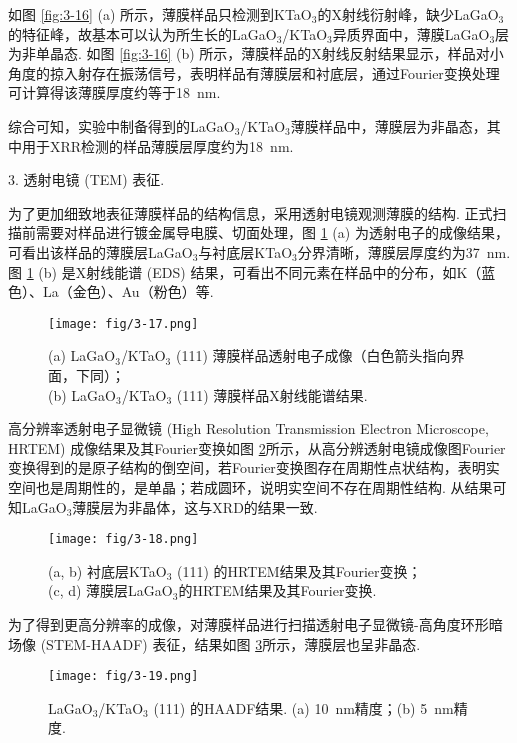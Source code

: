 \documentclass[12pt,a4paper,openany,twoside,UTF-8]{book}
\begin{document}
如图 \ref{fig:3-16} (a) 所示，薄膜样品只检测到KTaO$_3$的X射线衍射峰，缺少LaGaO$_3$的特征峰，故基本可以认为所生长的LaGaO$_3$/KTaO$_3$异质界面中，薄膜LaGaO$_3$层为非单晶态. 如图 \ref{fig:3-16} (b) 所示，薄膜样品的X射线反射结果显示，样品对小角度的掠入射存在振荡信号，表明样品有薄膜层和衬底层，通过Fourier变换处理可计算得该薄膜厚度约等于\SI{18}{nm}. 

综合可知，实验中制备得到的LaGaO$_3$/KTaO$_3$薄膜样品中，薄膜层为非晶态，其中用于XRR检测的样品薄膜层厚度约为\SI{18}{nm}. 

3. 透射电镜 (TEM) 表征.

为了更加细致地表征薄膜样品的结构信息，采用透射电镜观测薄膜的结构. 正式扫描前需要对样品进行镀金属导电膜、切面处理，图 \ref{fig:3-17} (a) 为透射电子的成像结果，可看出该样品的薄膜层LaGaO$_3$与衬底层KTaO$_3$分界清晰，薄膜层厚度约为\SI{37}{nm}. 图 \ref{fig:3-17} (b) 是X射线能谱 (EDS) 结果，可看出不同元素在样品中的分布，如K（蓝色）、La（金色）、Au（粉色）等.

\begin{figure}[htbp]
\centering
\texttt{[image: fig/3-17.png]}
\caption{(a) LaGaO$_3$/KTaO$_3$ (111) 薄膜样品透射电子成像（白色箭头指向界面，下同）；\\
(b) LaGaO$_3$/KTaO$_3$ (111) 薄膜样品X射线能谱结果.
}
\label{fig:3-17} 
\end{figure}

高分辨率透射电子显微镜 (High Resolution Transmission Electron Microscope, HRTEM) 成像结果及其Fourier变换如图 \ref{fig:3-18}所示，从高分辨透射电镜成像图Fourier 变换得到的是原子结构的倒空间，若Fourier变换图存在周期性点状结构，表明实空间也是周期性的，是单晶；若成圆环，说明实空间不存在周期性结构. 从结果可知LaGaO$_3$薄膜层为非晶体，这与XRD的结果一致.

\begin{figure}[htbp]
\centering
\texttt{[image: fig/3-18.png]}
\caption{(a, b) 衬底层KTaO$_3$ (111) 的HRTEM结果及其Fourier变换；\\
(c, d) 薄膜层LaGaO$_3$的HRTEM结果及其Fourier变换.}
\label{fig:3-18} 
\end{figure}

为了得到更高分辨率的成像，对薄膜样品进行扫描透射电子显微镜-高角度环形暗场像 (STEM-HAADF) 表征，结果如图 \ref{fig:3-19}所示，薄膜层也呈非晶态. 

\begin{figure}[htbp]
\centering
\texttt{[image: fig/3-19.png]}
\caption{LaGaO$_3$/KTaO$_3$ (111) 的HAADF结果. (a) \SI{10}{nm}精度；(b) \SI{5}{nm}精度.}
\label{fig:3-19} 
\end{figure}
\end{document}
